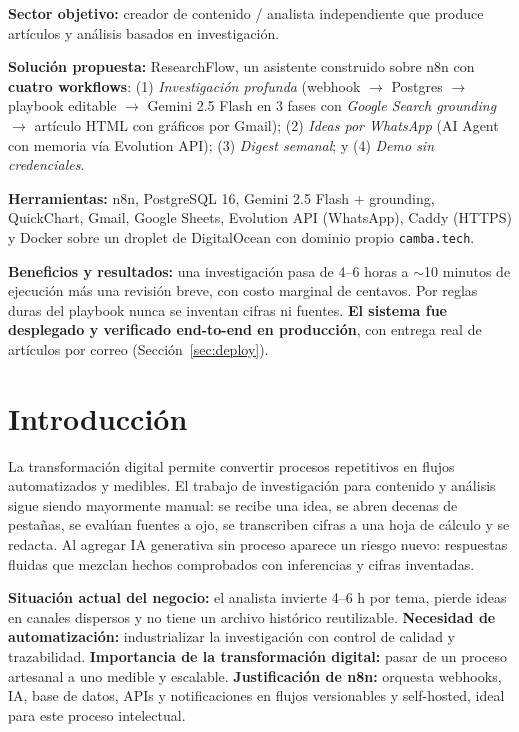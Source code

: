 \documentclass[11pt,a4paper]{article}
\newcommand{\code}[1]{\texttt{\small #1}}
\begin{document}
\textbf{Sector objetivo:} creador de contenido / analista independiente que produce artículos y análisis basados en investigación.

\textbf{Solución propuesta:} ResearchFlow, un asistente construido sobre n8n con \textbf{cuatro workflows}: (1) \emph{Investigación profunda} (webhook $\rightarrow$ Postgres $\rightarrow$ playbook editable $\rightarrow$ Gemini 2.5 Flash en 3 fases con \emph{Google Search grounding} $\rightarrow$ artículo HTML con gráficos por Gmail); (2) \emph{Ideas por WhatsApp} (AI Agent con memoria vía Evolution API); (3) \emph{Digest semanal}; y (4) \emph{Demo sin credenciales}.

\textbf{Herramientas:} n8n, PostgreSQL 16, Gemini 2.5 Flash + grounding, QuickChart, Gmail, Google Sheets, Evolution API (WhatsApp), Caddy (HTTPS) y Docker sobre un droplet de DigitalOcean con dominio propio \code{camba.tech}.

\textbf{Beneficios y resultados:} una investigación pasa de 4--6 horas a $\sim$10 minutos de ejecución más una revisión breve, con costo marginal de centavos. Por reglas duras del playbook nunca se inventan cifras ni fuentes. \textbf{El sistema fue desplegado y verificado end-to-end en producción}, con entrega real de artículos por correo (Sección~\ref{sec:deploy}).

\section{Introducción}
La transformación digital permite convertir procesos repetitivos en flujos automatizados y medibles. El trabajo de investigación para contenido y análisis sigue siendo mayormente manual: se recibe una idea, se abren decenas de pestañas, se evalúan fuentes a ojo, se transcriben cifras a una hoja de cálculo y se redacta. Al agregar IA generativa sin proceso aparece un riesgo nuevo: respuestas fluidas que mezclan hechos comprobados con inferencias y cifras inventadas.

\textbf{Situación actual del negocio:} el analista invierte 4--6 h por tema, pierde ideas en canales dispersos y no tiene un archivo histórico reutilizable. \textbf{Necesidad de automatización:} industrializar la investigación con control de calidad y trazabilidad. \textbf{Importancia de la transformación digital:} pasar de un proceso artesanal a uno medible y escalable. \textbf{Justificación de n8n:} orquesta webhooks, IA, base de datos, APIs y notificaciones en flujos versionables y self-hosted, ideal para este proceso intelectual.
\end{document}
